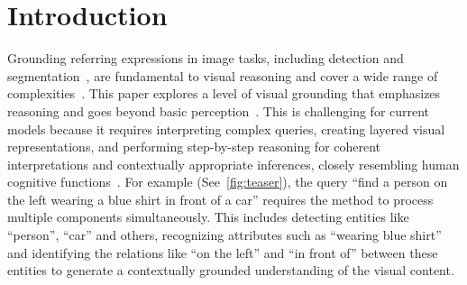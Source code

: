 \section{Introduction}
Grounding referring expressions in image tasks, including detection and segmentation~\cite{kazemzadeh_referitgame_2014}, are fundamental to visual reasoning and cover a wide range of complexities~\cite{yang_cross-modal_2019}.
This paper explores a level of visual grounding that emphasizes reasoning and goes beyond basic perception~\cite{yu_modeling_2016}. 
This is challenging for current models because it requires interpreting complex queries, creating layered visual representations, and performing step-by-step reasoning for coherent interpretations and contextually appropriate inferences, closely resembling human cognitive functions~\cite{amizadeh_neuro-symbolic_2020}.
For example (See~\autoref{fig:teaser}), the query ``find a person on the left wearing a blue shirt in front of a car'' requires the method to process multiple components simultaneously. This includes detecting entities like ``person'', ``car'' and others, recognizing attributes such as ``wearing blue shirt'' and identifying the relations like ``on the left'' and ``in front of'' between these entities to generate a contextually grounded understanding of the visual content. %
